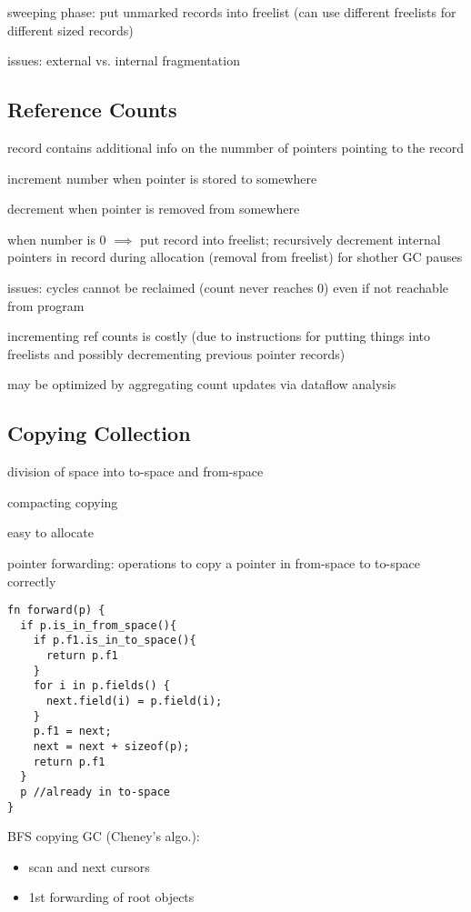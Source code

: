 \documentclass[8pt]{extarticle}
\begin{document}
\begin{multicols*}{2}
  sweeping phase: put unmarked records into freelist (can use different freelists for different sized records)

  issues: external vs. internal fragmentation

  \subsection{Reference Counts}

  record contains additional info on the nummber of pointers pointing to the record

  increment number when pointer is stored to somewhere

  decrement when pointer is removed from somewhere

  when number is 0 $\implies$ put record into freelist; recursively decrement internal pointers in record during allocation (removal from freelist) for shother GC pauses

  issues: cycles cannot be reclaimed (count never reaches 0) even if not reachable from program

  incrementing ref counts is costly (due to instructions for putting things into freelists and possibly decrementing previous pointer records)

  may be optimized by aggregating count updates via dataflow analysis

  \subsection{Copying Collection}

  division of space into to-space and from-space

  compacting copying

  easy to allocate

  pointer forwarding: operations to copy a pointer in from-space to to-space correctly

\begin{verbatim}
fn forward(p) {
  if p.is_in_from_space(){
    if p.f1.is_in_to_space(){
      return p.f1
    }
    for i in p.fields() {
      next.field(i) = p.field(i);
    }
    p.f1 = next;
    next = next + sizeof(p);
    return p.f1
  }
  p //already in to-space
}
\end{verbatim}
  
  BFS copying GC (Cheney's algo.):
  \begin{itemize}
  \item scan and next cursors
  \item 1st forwarding of root objects
  \end{itemize}


\end{multicols*}
\end{document}
